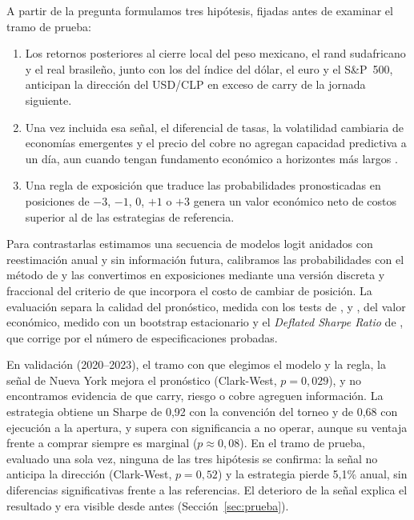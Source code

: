 \documentclass[11pt,a4paper]{article}
\begin{document}
A partir de la pregunta formulamos tres hipótesis, fijadas antes de examinar el tramo de prueba:
\begin{enumerate}\itemsep2pt
\item[\textbf{H1.}] Los retornos posteriores al cierre local del peso mexicano, el rand sudafricano y el real brasileño, junto con los del índice del dólar, el euro y el S\&P~500, anticipan la dirección del USD/CLP en exceso de carry de la jornada siguiente.
\item[\textbf{H2.}] Una vez incluida esa señal, el diferencial de tasas, la volatilidad cambiaria de economías emergentes y el precio del cobre no agregan capacidad predictiva a un día, aun cuando tengan fundamento económico a horizontes más largos \citep{chen2010,brunnermeier2008}.
\item[\textbf{H3.}] Una regla de exposición que traduce las probabilidades pronosticadas en posiciones de $-3$, $-1$, $0$, $+1$ o $+3$ genera un valor económico neto de costos superior al de las estrategias de referencia.
\end{enumerate}

Para contrastarlas estimamos una secuencia de modelos logit anidados con reestimación anual y sin información futura, calibramos las probabilidades con el método de \citet{platt1999} y las convertimos en exposiciones mediante una versión discreta y fraccional del criterio de \citet{kelly1956} que incorpora el costo de cambiar de posición. La evaluación separa la calidad del pronóstico, medida con los tests de \citet{clark2007}, \citet{diebold1995} y \citet{pesaran1992}, del valor económico, medido con un bootstrap estacionario \citep{politis1994} y el \emph{Deflated Sharpe Ratio} de \citet{bailey2014}, que corrige por el número de especificaciones probadas.

En validación (2020--2023), el tramo con que elegimos el modelo y la regla, la señal de Nueva York mejora el pronóstico (Clark-West, $p=0{,}029$), y no encontramos evidencia de que carry, riesgo o cobre agreguen información. La estrategia obtiene un Sharpe de 0,92 con la convención del torneo y de 0,68 con ejecución a la apertura, y supera con significancia a no operar, aunque su ventaja frente a comprar siempre es marginal ($p\approx0{,}08$). En el tramo de prueba, evaluado una sola vez, ninguna de las tres hipótesis se confirma: la señal no anticipa la dirección (Clark-West, $p=0{,}52$) y la estrategia pierde 5,1\% anual, sin diferencias significativas frente a las referencias. El deterioro de la señal explica el resultado y era visible desde antes (Sección~\ref{sec:prueba}).
\end{document}
